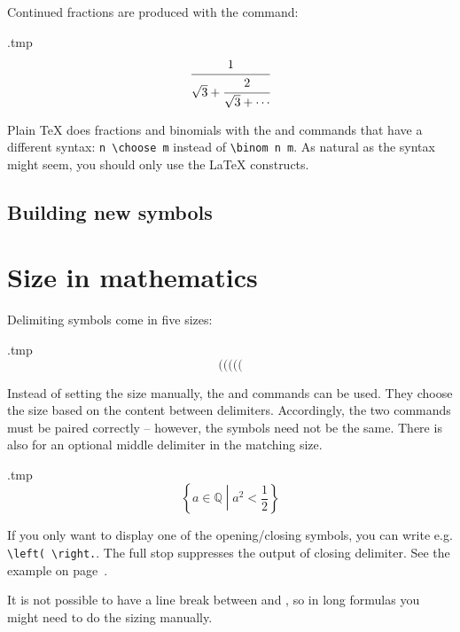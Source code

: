 Continued fractions are produced with the  command:
%
\begin{VerbatimOut}{\jobname.tmp}
\[
\cfrac{1}{\sqrt 3 + \cfrac{2}{\sqrt 3 + \dotsb}}
\]
\end{VerbatimOut}
\ShowExample

\begin{warning}
Plain \TeX{} does fractions and binomials with the  and  commands
that have a different syntax: \verb|n \choose m| instead of \verb|\binom n m|.
As natural as the syntax might seem, you should only use the \LaTeX{} constructs.
\end{warning}


%
%
\subsection{Building new symbols}





%
%
%
\section{Size in mathematics}

Delimiting symbols come in five sizes:
\begin{VerbatimOut}{\jobname.tmp}
\[
( \big( \Big( \bigg( \Bigg(
\]
\end{VerbatimOut}
\ShowExample
%
Instead of setting the size manually,
the  and  commands can be used.
They choose the size based on the content between delimiters.
Accordingly, the two commands must be paired correctly
-- however, the symbols need not be the same.
There is also  for an optional middle delimiter in the matching size.
%
\begin{VerbatimOut}{\jobname.tmp}
\[
\left\{ a \in \mathbb Q
  \middle| a^2 < \frac 1 2 \right\}
\]
\end{VerbatimOut}
\ShowExample
%
If you only want to display one of the opening/closing symbols,
you can write e.g. \verb|\left( \right.|.
The full stop suppresses the output of closing delimiter.
See the example on page~\pageref{ex:math equations in cases}.

\begin{gotcha}
It is not possible to have a line break between  and ,
so in long formulas you might need to do the sizing manually.
\end{gotcha}

